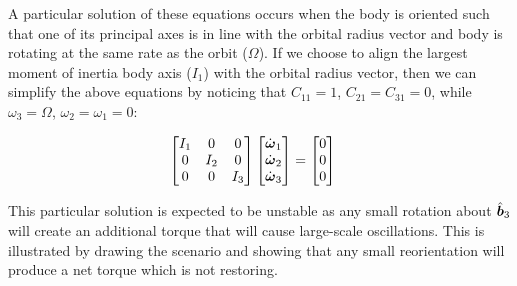 A particular solution of these equations occurs when the body is oriented such that one of its principal axes is in line with the orbital radius vector and body is rotating at the same rate as the orbit ($\Omega$). If we choose to align the largest moment of inertia body axis ($I_1$) with the orbital radius vector, then we can simplify the above equations by noticing that $C_{11} = 1$, $C_{21} = C_{31} = 0$, while $\omega_3 = \Omega$, $\omega_2 = \omega_1 = 0$:

\begin{align*}
    \begin{bmatrix} I_1 & 0 & 0 \\ 0 & I_2 & 0 \\ 0 & 0 & I_3 \end{bmatrix} \begin{bmatrix} \dot{\boldsymbol{\omega}}_1 \\ \dot{\boldsymbol{\omega}}_2 \\ \dot{\boldsymbol{\omega}}_3 \end{bmatrix} &= \begin{bmatrix} 0 \\ 0 \\ 0 \end{bmatrix} 
\end{align*}

This particular solution is expected to be unstable as any small rotation about $\hat{\boldsymbol{b}}_3$ will create an additional torque that will cause large-scale oscillations. This is illustrated by drawing the scenario and showing that any small reorientation will produce a net torque which is not restoring.


